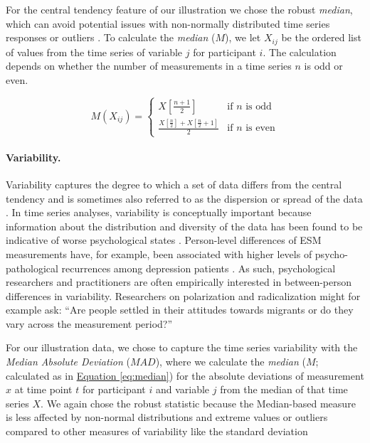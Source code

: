 \documentclass[man, 12pt, a4paper, floatsintext]{apa7}
\theoremstyle{break}
\theoremstyle{plain}
\newcommand{\equatref}[2][]{\hyperref[#2]{Equation \ref*{#2}#1}}
\begin{document}
For the central tendency feature of our illustration we chose the robust
\textit{median}, which can avoid potential issues with non-normally
distributed time series responses or outliers \citep{weisberg1992}. To
calculate the \textit{median} (\(M\)), we let \(X_{ij}\) be the ordered
list of values from the time series of variable \(j\) for participant
\(i\). The calculation depends on whether the number of measurements in
a time series \(n\) is odd or even.

\begin{equation} \label{eq:median}
  M(X_{ij}) = 
    \begin{cases}
      X \left[ \frac{n+1}{2} \right] & \text{if $n$ is odd} \\
      \frac{X \left[ \frac{n}{2} \right] + X \left[ \frac{n}{2} +1 \right]}{2} & \text{if $n$ is even}
    \end{cases}
\end{equation}

\paragraph{Variability.}

Variability captures the degree to which a set of data differs from the
central tendency and is sometimes also referred to as the dispersion or
spread of the data \citep{weisberg1992}. In time series analyses,
variability is conceptually important because information about the
distribution and diversity of the data has been found to be indicative
of worse psychological states \citep{myin-germeys2018, helmich2021}.
Person-level differences of ESM measurements have, for example, been
associated with higher levels of psycho-pathological recurrences among
depression patients \citep{timm2017}. As such, psychological researchers
and practitioners are often empirically interested in between-person
differences in variability. Researchers on polarization and
radicalization might for example ask: ``Are people settled in their
attitudes towards migrants or do they vary across the measurement
period?''

For our illustration data, we chose to capture the time series
variability with the \textit{Median Absolute Deviation} (\(MAD\)), where
we calculate the \textit{median} (\(M\); calculated as in
\equatref{eq:median}) for the absolute deviations of measurement \(x\)
at time point \(t\) for participant \(i\) and variable \(j\) from the
median of that time series \(X\). We again chose the robust statistic
because the Median-based measure is less affected by non-normal
distributions and extreme values or outliers compared to other measures
of variability like the standard deviation \citep{weisberg1992}
\end{document}
